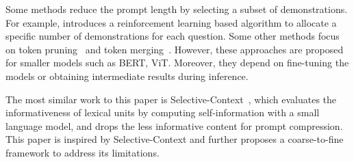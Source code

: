 Some methods reduce the prompt length by selecting a subset of demonstrations.
For example, \citet{zhou2023efficient} introduces a reinforcement learning based algorithm to allocate a specific number of demonstrations for each question.
Some other methods focus on token pruning~\cite{goyal2020power,kim2021length,kim2022learned,rao2021dynamicvit,modarressi2022adapler} and token merging~\cite{bolya2023token}.
However, these approaches are proposed for smaller models such as BERT, ViT.
Moreover, they depend on fine-tuning the models or obtaining intermediate results during inference.

The most similar work to this paper is Selective-Context~\cite{li2023unlocking}, 
which evaluates the informativeness of lexical units by computing self-information with a small language model, and drops the less informative content for prompt compression. 
This paper is inspired by Selective-Context and further proposes a coarse-to-fine framework to address its limitations. 




